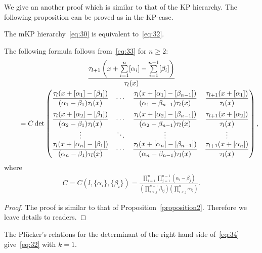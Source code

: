 \documentclass[pdftex]{sigma}
\begin{document}
We give an another proof which is similar to that of the KP hierarchy.
The following proposition can be proved as in the KP-case.
\begin{proposition}\label{proposition4}
The mKP hierarchy~\eqref{eq:30} is equivalent to~\eqref{eq:32}.
\end{proposition}
\begin{proposition}\label{proposition5}
The following formula follows from~\eqref{eq:33} for $n\ge2$:
\begin{gather}
\frac{\tau_{l+1}\left(x+\sum\limits_{i=1}^{n}[\alpha_i]-\sum\limits_{i=1}^{n-1}[\beta_i]\right)}{\tau_l(x)}\nonumber
\\
\qquad
{}=C\det\left(
\begin{matrix}\dfrac{\tau_l(x+[\alpha_1]-[\beta_1])}{(\alpha_1-\beta_1)\tau_l(x)}
&\cdots&\dfrac{\tau_l(x+[\alpha_1]-[\beta_{n-1}])}{(\alpha_1-\beta_{n-1})\tau_l(x)}&\dfrac{\tau_{l+1}
(x+[\alpha_1])}{\tau_l(x)}
\vspace{2mm}\\
\dfrac{\tau_l(x+[\alpha_2]-[\beta_1])}{(\alpha_2-\beta_1)\tau_l(x)}
&\cdots&\dfrac{\tau_l(x+[\alpha_2]-[\beta_{n-1}])}{(\alpha_2-\beta_{n-1})\tau_l(x)}&\dfrac{\tau_{l+1}
(x+[\alpha_2])}{\tau_l(x)}
\\
\vdots&\ddots&\vdots&\vdots
\\
\dfrac{\tau_l(x+[\alpha_n]-[\beta_1])}{(\alpha_n-\beta_1)\tau_l(x)}
&\cdots&\dfrac{\tau_l(x+[\alpha_n]-[\beta_{n-1}])}{(\alpha_n-\beta_{n-1})\tau_l(x)}&\dfrac{\tau_{l+1}
(x+[\alpha_n])}{\tau_l(x)}
\end{matrix}
\right),
\label{eq:34}
\end{gather}
where
\begin{gather*}
C=C(l,\{\alpha_i\},\{\beta_i\})=\frac{\prod\limits_{i=1}^{n}\prod\limits_{j=1}^{n-1}(\alpha_i-\beta_j)}{\left(\prod\limits_{i<j}^{n-1}
\beta_{ij}\right)\left(\prod\limits_{i>j}^{n}\alpha_{ij}\right)}.
\end{gather*}
\end{proposition}
\begin{proof}
The proof is similar to that of Proposition~\ref{proposition2}.
Therefore we leave details to readers.
\end{proof}
\begin{proposition}\label{proposition6}
The Pl\"{u}cker's relations for the determinant of the right hand side of~\eqref{eq:34} give~\eqref{eq:32}
with $k=1$.
\end{proposition}
\end{document}
